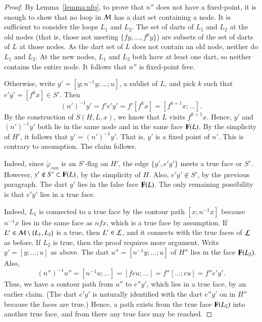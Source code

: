 \begin{proof}
 By Lemma~\ref{lemma:nfp}, to prove that $n''$
does not have a fixed-point, it is enough to show that no loop in
${\cal M}$ has a dart set containing a node.  It is sufficient to
consider the loops $L_1$ and $L_2$.  The set of darts of $L_1$ and
$L_2$ at the old nodes (that is, those not meeting $\{f y,\ldots,f^p
y\}$) are subsets of the set of darts of $L$ at those nodes.  As the
dart set of $L$ does not contain an old node, neither do $L_1$ and
$L_2$.  At the new nodes, $L_1$ and $L_2$ both have at least one dart,
so neither contains the entire node.  It follows that $n''$ is
fixed-point free.

Otherwise, write $y' = [y;n^{-1}y;\ldots;u]$, a sublist of $L$, and
pick $k$ such that $e'y' = [f^k x]\in S'$.  Then
\[ 
(n')^{-1} y' = f'e'y' = f'[f^k x] = [f^{k+1}x;\ldots].
\] 
By the construction of $S(H,L,x)$, we know that $L$ visits $f^{k+1}x$.
Hence, $y'$ and $(n')^{-1}y'$ both lie in the same node and in the same
face ${\mathbf F}(L)$.  By the simplicity of $H'$, it follows that $y' =
(n')^{-1} y'$.  That is, $y'$ is a fixed point of $n'$.  This is contrary to
assumption. The claim follows.


  Indeed, since
$\check\varphi_{can}$ is an $S'$-flag on $H'$, the edge $\{y',e'y'\}$
meets a true face or $S'$.  However, $y'\not\in S'\subset {\mathbf F}(L)$, by
the simplicity of $H$.  Also, $e'y'\not\in S'$, by the previous
paragraph.  The dart $y'$ lies in the false face ${\mathbf F}(L)$.  The only
remaining possibility is that $e'y'$ lies in a true face.



   Indeed,
$L_1$ is connected to a true face by the contour path $[x;n^{-1} x]$
because $n^{-1} x$ lies in the same face as $n f x$, which is a true
face by assumption.  If $L'\in{\cal M}\setminus\{L_1,L_2\}$ is a true,
then $L'\in {\cal L}$, and it connects with the true faces of ${\cal
  L}$ as before.  If $L_2$ is true, then the proof requires more
argument.  Write $y'=[y;\ldots;u]$ as above.  The dart
$u''=[n^{-1}y;\ldots;u]$ of $H''$ lies in the face ${\mathbf F}(L_2)$.  Also,
\[ 
(n'')^{-1} u''= [n^{-1} u;\ldots] = [f e u;\ldots] = f'' [\ldots; e u]
  = f'' e' y'.
\] 
Thus, we have a contour path from $u''$ to $e'' y'$, which lies in a
true face, by an earlier claim.  (The dart $e'y'$ is naturally
identified with the dart $e'' y'$ on in $H''$ because the faces are
true.)  Hence, a path exists from the true face ${\mathbf F}(L_2)$ into another
true face, and from there any true face may be reached.


\end{proof}
